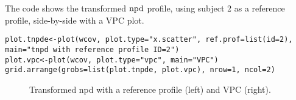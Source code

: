 The code shows the transformed ${\rm npd}$ profile, using subject 2 as a reference profile, side-by-side with a VPC plot.

\begin{verbatim}
plot.tnpde<-plot(wcov, plot.type="x.scatter", ref.prof=list(id=2), 
main="tnpd with reference profile ID=2")
plot.vpc<-plot(wcov, plot.type="vpc", main="VPC")
grid.arrange(grobs=list(plot.tnpde, plot.vpc), nrow=1, ncol=2)
\end{verbatim}

\begin{figure}[!h]
\par\kern -0.2cm
\begin{center}
\end{center}
\caption{Transformed npd with a reference profile (left) and VPC (right).}\label{fig:refprofile}
\end{figure}




